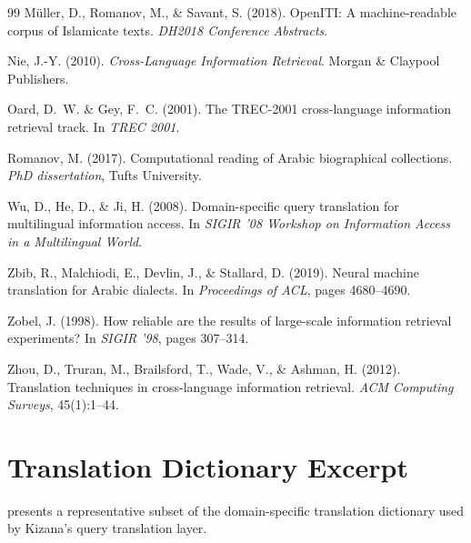\documentclass[preprint,12pt,authoryear]{elsarticle}
\begin{document}
\begin{thebibliography}{99}
M{\"u}ller, D., Romanov, M., \& Savant, S. (2018).
\newblock OpenITI: A machine-readable corpus of Islamicate texts.
\newblock \textit{DH2018 Conference Abstracts}.

Nie, J.-Y. (2010).
\newblock \textit{Cross-Language Information Retrieval}.
\newblock Morgan \& Claypool Publishers.

Oard, D.~W. \& Gey, F.~C. (2001).
\newblock The TREC-2001 cross-language information retrieval track.
\newblock In \textit{TREC 2001}.

Romanov, M. (2017).
\newblock Computational reading of Arabic biographical collections.
\newblock \textit{PhD dissertation}, Tufts University.

Wu, D., He, D., \& Ji, H. (2008).
\newblock Domain-specific query translation for multilingual information access.
\newblock In \textit{SIGIR '08 Workshop on Information Access in a Multilingual World}.

Zbib, R., Malchiodi, E., Devlin, J., \& Stallard, D. (2019).
\newblock Neural machine translation for Arabic dialects.
\newblock In \textit{Proceedings of ACL}, pages 4680--4690.

Zobel, J. (1998).
\newblock How reliable are the results of large-scale information retrieval experiments?
\newblock In \textit{SIGIR '98}, pages 307--314.

Zhou, D., Truran, M., Brailsford, T., Wade, V., \& Ashman, H. (2012).
\newblock Translation techniques in cross-language information retrieval.
\newblock \textit{ACM Computing Surveys}, 45(1):1--44.

\end{thebibliography}

\appendix

\section{Translation Dictionary Excerpt}
\label{appendix:dictionary}

 presents a representative subset of the domain-specific translation dictionary used by Kizana's query translation layer.
\end{document}

